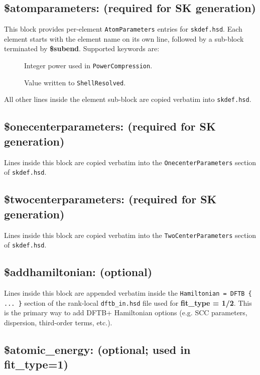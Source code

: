 \subsection{\$atomparameters: (required for SK generation)}

This block provides per-element \texttt{AtomParameters} entries for \texttt{skdef.hsd}. Each element starts
with the element name on its own line, followed by a sub-block terminated by \textbf{\$subend}. Supported
keywords are:

\begin{description}
\item[] Integer power used in \texttt{PowerCompression}.
\item[] Value written to \texttt{ShellResolved}.
\end{description}

All other lines inside the element sub-block are copied verbatim into \texttt{skdef.hsd}.

\subsection{\$onecenterparameters: (required for SK generation)}

Lines inside this block are copied verbatim into the \texttt{OnecenterParameters} section of \texttt{skdef.hsd}.

\subsection{\$twocenterparameters: (required for SK generation)}

Lines inside this block are copied verbatim into the \texttt{TwoCenterParameters} section of \texttt{skdef.hsd}.

\subsection{\$addhamiltonian: (optional)}

Lines inside this block are appended verbatim inside the \texttt{Hamiltonian = DFTB \{ ... \}} section of the
rank-local \texttt{dftb\_in.hsd} file used for \textbf{fit\_type = 1/2}. This is the primary way to add DFTB+
Hamiltonian options (e.g. SCC parameters, dispersion, third-order terms, etc.).

\subsection{\$atomic\_energy: (optional; used in fit\_type=1)}

